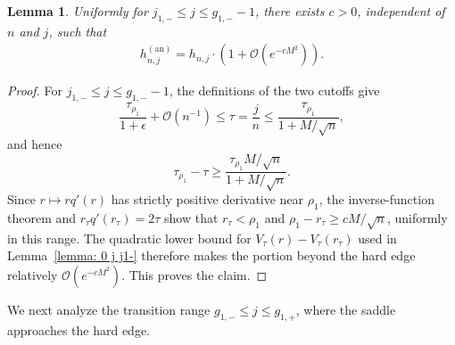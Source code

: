 \documentclass[a4paper]{article}
\newtheorem{lemma}[theorem]{Lemma}
\numberwithin{equation}{section}
\begin{document}
\begin{lemma}\label{lemma: j1- j g1-}
Uniformly for $j_{1,-}\leq j\leq g_{1,-}-1$, there exists $c>0$, independent of $n$ and $j$, such that
\begin{align}
h_{n,j}^{(\mathrm{an})}
=h_{n,j}\cdot(1+\mathcal{O}(e^{-c M^2})).
\end{align}
\end{lemma}
\begin{proof}
For $j_{1,-}\leq j\leq g_{1,-}-1$, the definitions of the two cutoffs give
\[
\frac{\tau_{\rho_1}}{1+\epsilon}+\mathcal O(n^{-1})
\leq \tau=\frac{j}{n}
\leq \frac{\tau_{\rho_1}}{1+M/\sqrt n},
\]
and hence
\[
\tau_{\rho_1}-\tau
\geq \frac{\tau_{\rho_1}M/\sqrt n}{1+M/\sqrt n}.
\]
Since $r\mapsto rq'(r)$ has strictly positive derivative near $\rho_1$, the inverse-function theorem and
$r_\tau q'(r_\tau)=2\tau$ show that $r_\tau<\rho_1$ and
$\rho_1-r_\tau\geq cM/\sqrt n$, uniformly in this range. The quadratic lower bound for
$V_\tau(r)-V_\tau(r_\tau)$ used in Lemma~\ref{lemma: 0 j j1-} therefore makes the portion beyond the hard edge relatively $\mathcal O(e^{-cM^2})$. This proves the claim.
\end{proof}


We next analyze the transition range $g_{1,-}\leq j\leq g_{1,+}$, where the saddle approaches the hard edge.
\end{document}
